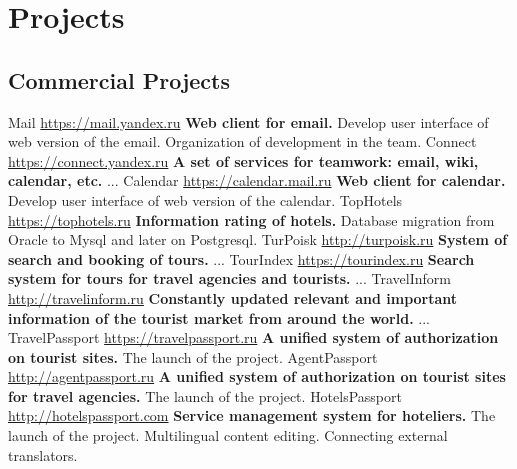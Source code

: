 \documentclass[11pt,a4paper]{moderncv}
\begin{document}
\maketitle
\section{Projects}
  \subsection{Commercial Projects}
  \cvline
    {Mail}
    {\url{https://mail.yandex.ru}\newline{}
    \textbf{Web client for email.}\newline{}
    Develop user interface of web version of the email.\newline{}
    Organization of development in the team.}
  \cvline
    {Connect}
    {\url{https://connect.yandex.ru}\newline{}
    \textbf{A set of services for teamwork: email, wiki, calendar, etc.}\newline{}
    ...}
  \cvline
    {Calendar}
    {\url{https://calendar.mail.ru}\newline{}
    \textbf{Web client for calendar.}\newline{}
    Develop user interface of web version of the calendar.}
  \cvline
    {TopHotels}
    {\url{https://tophotels.ru}\newline{}
    \textbf{Information rating of hotels.}\newline{}
    Database migration from Oracle to Mysql and later on Postgresql.}
  \cvline
    {TurPoisk}
    {\url{http://turpoisk.ru}\newline{}
    \textbf{System of search and booking of tours.}\newline{}
    ...}
  \cvline
    {TourIndex}
    {\url{https://tourindex.ru}\newline{}
    \textbf{Search system for tours for travel agencies and tourists.}\newline{}
    ...}
  \cvline
    {TravelInform}
    {\url{http://travelinform.ru}\newline{}
    \textbf{Constantly updated relevant and important information of the tourist market from around the world.}\newline{}
    ...}
  \cvline
    {TravelPassport}
    {\url{https://travelpassport.ru}\newline{}
    \textbf{A unified system of authorization on tourist sites.}\newline{}
    The launch of the project.}
  \cvline
    {AgentPassport}
    {\url{http://agentpassport.ru}\newline{}
    \textbf{A unified system of authorization on tourist sites for travel agencies.}\newline{}
    The launch of the project.}
  \cvline
    {HotelsPassport}
    {\url{http://hotelspassport.com}\newline{}
    \textbf{Service management system for hoteliers.}\newline{}
    The launch of the project.\newline{}
    Multilingual content editing. Connecting external translators.}
\end{document}
